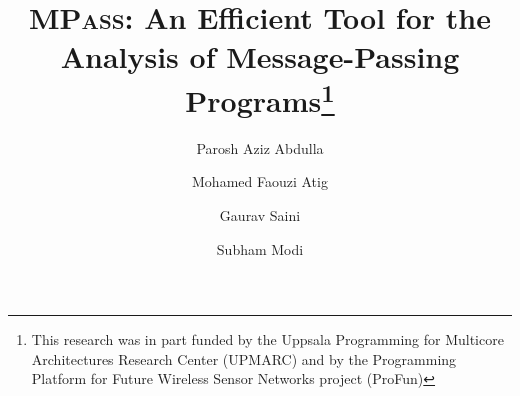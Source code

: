 \documentclass{llncs}
\newcommand{\MPass}{\textsc{MPass}}
\begin{document}
\title{\MPass:  An Efficient  Tool for the Analysis of Message-Passing Programs\thanks{This research was in part funded by the
    Uppsala Programming for Multicore Architectures Research Center
    (UPMARC)
    and by the Programming Platform for Future Wireless Sensor Networks project (ProFun)}
    }

\author{Parosh Aziz Abdulla \and Mohamed Faouzi Atig \and Gaurav Saini \and Subham Modi }

\maketitle





% 

 





\newpage
{}
{}




\end{document}
